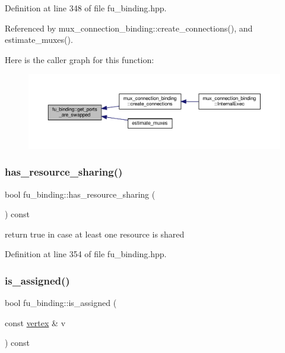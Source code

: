 Definition at line 348 of file fu\+\_\+binding.\+hpp.



Referenced by mux\+\_\+connection\+\_\+binding\+::create\+\_\+connections(), and estimate\+\_\+muxes().

Here is the caller graph for this function\+:
\nopagebreak
\begin{figure}[H]
\begin{center}
\leavevmode
\includegraphics[width=350pt]{d8/d04/classfu__binding_a025a171ca9de5dbd653047a66cdae181_icgraph}
\end{center}
\end{figure}
\mbox{\label{classfu__binding_a9af2939915377be1e45fcd905efc512b}} 
\subsubsection{\texorpdfstring{has\+\_\+resource\+\_\+sharing()}{has\_resource\_sharing()}}
{\footnotesize\ttfamily bool fu\+\_\+binding\+::has\+\_\+resource\+\_\+sharing (\begin{DoxyParamCaption}{ }\end{DoxyParamCaption}) const\hspace{0.3cm}{\ttfamily [inline]}}



return true in case at least one resource is shared 



Definition at line 354 of file fu\+\_\+binding.\+hpp.

\mbox{\label{classfu__binding_a083bb7586153b82403d770d191c660aa}} 
\subsubsection{\texorpdfstring{is\+\_\+assigned()}{is\_assigned()}\hspace{0.1cm}{\footnotesize\ttfamily [1/2]}}
{\footnotesize\ttfamily bool fu\+\_\+binding\+::is\+\_\+assigned (\begin{DoxyParamCaption}\item[{const \hyperlink{graph_8hpp_abefdcf0544e601805af44eca032cca14}{vertex} \&}]{v }\end{DoxyParamCaption}) const}



